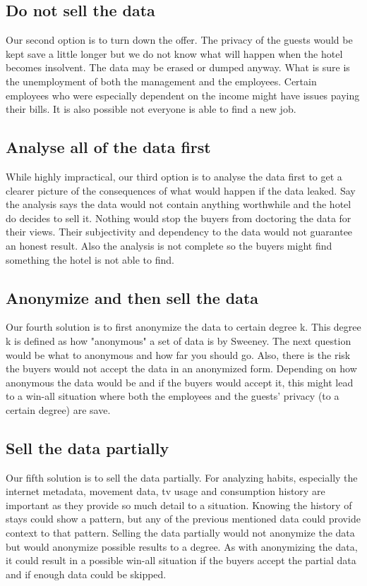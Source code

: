 \subsection{Do not sell the data}
Our second option is to turn down the offer. The privacy of the guests would be kept save a little longer but we do not know what will happen when the hotel becomes insolvent. The data may be erased or dumped anyway. What is sure is the unemployment of both the management and the employees. Certain employees who were especially dependent on the income might have issues paying their bills. It is also possible not everyone is able to find a new job. 

\subsection{Analyse all of the data first}
While highly impractical, our third option is to analyse the data first to get a clearer picture of the consequences of what would happen if the data leaked. Say the analysis says the data would not contain anything worthwhile and the hotel do decides to sell it. Nothing would stop the buyers from doctoring the data for their views. Their subjectivity and dependency to the data would not guarantee an honest result. Also the analysis is not complete so the buyers might find something the hotel is not able to find.

\subsection{Anonymize and then sell the data}
Our fourth solution is to first anonymize the data to certain degree k. This degree k is defined as how "anonymous" a set of data is by Sweeney\cite{k_anonymity}. The next question would be what to anonymous and how far you should go. Also, there is the risk the buyers would not accept the data in an anonymized form. Depending on how anonymous the data would be and if the buyers would accept it, this might lead to a win-all situation where both the employees and the guests' privacy (to a certain degree) are save.

\subsection{Sell the data partially}
Our fifth solution is to sell the data partially. For analyzing habits, especially the internet metadata, movement data, tv usage and consumption history are important as they provide so much detail to a situation. Knowing the history of stays could show a pattern, but any of the previous mentioned data could provide context to that pattern. Selling the data partially would not anonymize the data but would anonymize possible results to a degree. As with anonymizing the data, it could result in a possible win-all situation if the buyers accept the partial data and if enough data could be skipped.

